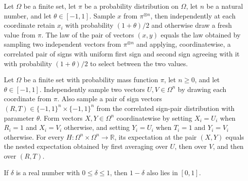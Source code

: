 \begin{theorem}
\label{FABL.literalProductSelectorPairPMF_eq_productRetention}
\leanok
{}
Let $\Omega$ be a finite set, let $\pi$ be a probability distribution on $\Omega$, let
$n$ be a natural number, and let $\theta\in[-1,1]$. Sample $x$ from $\pi^{\otimes n}$,
then independently at each coordinate retain $x_i$ with probability $(1+\theta)/2$ and
otherwise draw a fresh value from $\pi$. The law of the pair of vectors $(x,y)$ equals
the law obtained by sampling two independent vectors from $\pi^{\otimes n}$ and
applying, coordinatewise, a correlated pair of signs with uniform first sign and second
sign agreeing with it with probability $(1+\theta)/2$ to select between the two values.
\end{theorem}

\begin{theorem}
\label{FABL.pmfExpectation_literalProductSelectorPairPMF}
\leanok
{}
Let $\Omega$ be a finite set with probability mass function $\pi$, let $n\geq 0$, and
let $\theta\in[-1,1]$. Independently sample two vectors $U,V\in\Omega^n$ by drawing each
coordinate from $\pi$. Also sample a pair of sign vectors
$(R,T)\in\{-1,1\}^n\times\{-1,1\}^n$ from the correlated sign-pair distribution with
parameter $\theta$. Form vectors $X,Y\in\Omega^n$ coordinatewise by setting $X_i=U_i$
when $R_i=1$ and $X_i=V_i$ otherwise, and setting $Y_i=U_i$ when $T_i=1$ and $Y_i=V_i$
otherwise. For every $H:\Omega^n\times\Omega^n\to\mathbb{R}$, its expectation at the
pair $(X,Y)$ equals the nested expectation obtained by first averaging over $U$, then
over $V$, and then over $(R,T)$.
\end{theorem}

\begin{theorem}
\label{FABL.one_sub_mem_Icc}
\leanok
{}
If $\delta$ is a real number with $0\leq\delta\leq 1$, then $1-\delta$ also lies in
$[0,1]$.
\end{theorem}

